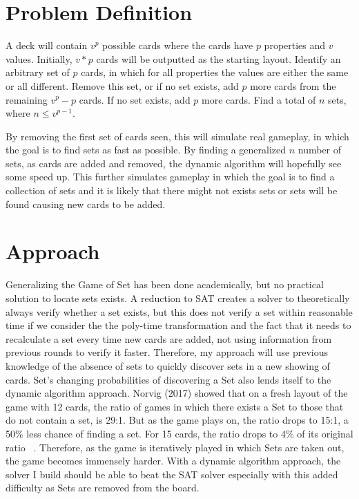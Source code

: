 \documentclass[12pt]{article}%
\begin{document}
\section*{Problem Definition}

A deck will contain $v^p$ possible cards where the cards have $p$ properties and $v$ values. Initially, $v*p$ cards will be outputted as the starting layout. Identify an arbitrary set of $p$ cards, in which for all properties the values are either the same or all different. Remove this set, or if no set exists, add $p$ more cards from the remaining $v^p - p$ cards. If no set exists, add $p$ more cards. Find a total of $n$ sets, where $n \leq v^{p-1}$. 

By removing the first set of cards seen, this will simulate real gameplay, in which the goal is to find sets as fast as possible. By finding a generalized $n$ number of sets, as cards are added and removed, the dynamic algorithm will hopefully see some speed up. This further simulates gameplay in which the goal is to find a collection of sets and it is likely that there might not exists sets or sets will be found causing new cards to be added. 

\section*{Approach}

\hspace{5mm} Generalizing the Game of Set has been done academically, but no practical solution to locate sets exists. A reduction to SAT creates a solver to theoretically always verify whether a set exists, but this does not verify a set within reasonable time if we consider the the poly-time transformation and the fact that it needs to recalculate a set every time new cards are added, not using information from previous rounds to verify it faster. Therefore, my approach will use previous knowledge of the absence of sets to quickly discover sets in a new showing of cards. Set's changing probabilities of discovering a Set also lends itself to the dynamic algorithm approach. Norvig (2017) showed that on a fresh layout of the game with 12 cards, the ratio of games in which there exists a Set to those that do not contain a set, is 29:1. But as the game plays on, the ratio drops to 15:1, a 50\% less chance of finding a set. For 15 cards, the ratio drops to 4\% of its original ratio ~\cite{norvig}. Therefore, as the game is iteratively played in which Sets are taken out, the game becomes immensely harder. With a dynamic algorithm approach, the solver I build should be able to beat the SAT solver especially with this added difficulty as Sets are removed from the board. 
\end{document}
